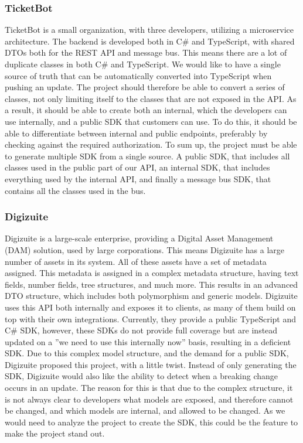 \subsubsection{TicketBot \label{sec:intro_ticketbot}}
TicketBot is a small organization, with three developers, utilizing a microservice architecture.
The backend is developed both in C\# and TypeScript, with shared DTOs both for the REST API and message bus.
This means there are a lot of duplicate classes in both C\# and TypeScript. We would like to have a single source of truth that can be automatically converted into TypeScript when pushing an update.
The project should therefore be able to convert a series of classes, not only limiting itself to the classes that are not exposed in the API. 
As a result, it should be able to create both an internal, which the developers can use internally, and a public SDK that customers can use.
To do this, it should be able to differentiate between internal and public endpoints, preferably by checking against the required authorization.
To sum up, the project must be able to generate multiple SDK from a single source. A public SDK, that includes all classes used in the public part of our API, an internal SDK, that includes everything used by the internal API, and finally a message bus SDK, that contains all the classes used in the bus.

\subsubsection{Digizuite \label{sec:intro_digizuite}}
Digizuite is a large-scale enterprise, providing a Digital Asset Management (DAM) solution, used by large corporations. 
This means Digizuite has a large number of assets in its system. All of these assets have a set of metadata assigned.
This metadata is assigned in a complex metadata structure, having text fields, number fields, tree structures, and much more.
This results in an advanced DTO structure, which includes both polymorphism and generic models.  
Digizuite uses this API both internally and exposes it to clients, as many of them build on top with their own integrations.
Currently, they provide a public TypeScript and C\# SDK, however, these SDKs do not provide full coverage but are instead updated on a ''we need to use this internally now'' basis, resulting in a deficient SDK.
\newline\newline
Due to this complex model structure, and the demand for a public SDK, Digizuite proposed this project, with a little twist.
Instead of only generating the SDK, Digizuite would also like the ability to detect when a breaking change occurs in an update.
The reason for this is that due to the complex structure, it is not always clear to developers what models are exposed, and therefore cannot be changed, and which models are internal, and allowed to be changed.
As we would need to analyze the project to create the SDK, this could be the feature to make the project stand out.

